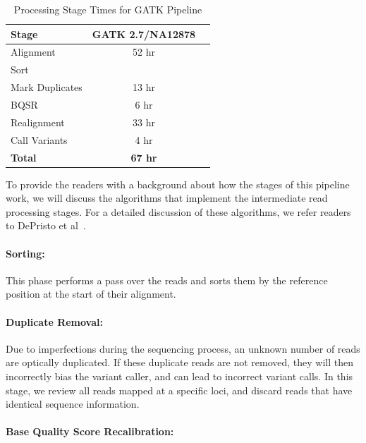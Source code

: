 \documentclass[10pt,twocolumn]{article}
\theoremstyle{plain}
\begin{document}
\begin{table}[h]
\caption{Processing Stage Times for GATK Pipeline}
\label{tab:stage-time}
\begin{center}
\begin{tabular}{| l | c | c |}
\hline
\bf Stage & \bf GATK 2.7/NA12878 \\
\hline
Alignment & 52 hr \\
Sort & \\
Mark Duplicates & 13 hr \\
BQSR & 6 hr \\
Realignment & 33 hr \\
Call Variants & 4 hr \\
\bf Total & \bf 67 hr \\
\hline
\end{tabular}
\end{center}
\end{table}

To provide the readers with a background about how the stages of this pipeline work, we will discuss the algorithms that
implement the intermediate read processing stages. For a detailed discussion of these algorithms, we refer readers to DePristo
et al~\cite{depristo11}.

\paragraph{Sorting:}
\label{sec:sorting}

This phase performs a pass over the reads and sorts them by the reference position at the start of their alignment.

\paragraph{Duplicate Removal:} 
\label{sec:duplicate-removal}

Due to imperfections during the sequencing process, an unknown number of reads are optically duplicated. If these duplicate
reads are not removed, they will then incorrectly bias the variant caller, and can lead to incorrect variant calls. In this stage, we
review all reads mapped at a specific loci, and discard reads that have identical sequence information.

\paragraph{Base Quality Score Recalibration:} 
\label{sec:bqsr}
\end{document}
